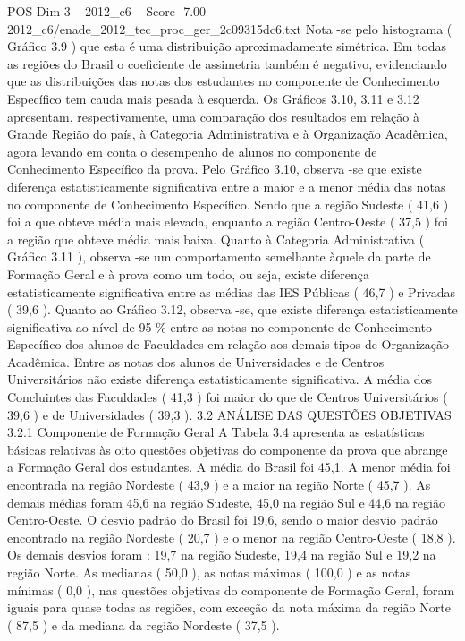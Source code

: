 \begin{textsample}{POS Dim 3 – 2012\_c6 – Score -7.00 – 2012\_c6/enade\_2012\_tec\_proc\_ger\_2c09315dc6.txt}
Nota -se pelo histograma ( Gráfico 3.9 ) que esta é uma distribuição aproximadamente simétrica.
Em todas as regiões do Brasil o coeficiente de assimetria também é negativo, evidenciando que as distribuições das notas dos estudantes no componente de Conhecimento Específico tem cauda mais pesada à esquerda.
Os Gráficos 3.10, 3.11 e 3.12 apresentam, respectivamente, uma comparação dos resultados em relação à Grande Região do país, à Categoria Administrativa e à Organização Acadêmica, agora levando em conta o desempenho de alunos no componente de Conhecimento Específico da prova.
Pelo Gráfico 3.10, observa -se que existe diferença estatisticamente significativa entre a maior e a menor média das notas no componente de Conhecimento Específico.
Sendo que a região Sudeste ( 41,6 ) foi a que obteve média mais elevada, enquanto a região Centro-Oeste ( 37,5 ) foi a região que obteve média mais baixa.
Quanto à Categoria Administrativa ( Gráfico 3.11 ), observa -se um comportamento semelhante àquele da parte de Formação Geral e à prova como um todo, ou seja, existe diferença estatisticamente significativa entre as médias das IES Públicas ( 46,7 ) e Privadas ( 39,6 ).
Quanto ao Gráfico 3.12, observa -se, que existe diferença estatisticamente significativa ao nível de 95 \% entre as notas no componente de Conhecimento Específico dos alunos de Faculdades em relação aos demais tipos de Organização Acadêmica.
Entre as notas dos alunos de Universidades e de Centros Universitários não existe diferença estatisticamente significativa.
A média dos Concluintes das Faculdades ( 41,3 ) foi maior do que de Centros Universitários ( 39,6 ) e de Universidades ( 39,3 ). 3.2 ANÁLISE DAS QUESTÕES OBJETIVAS 3.2.1 Componente de Formação Geral A Tabela 3.4 apresenta as estatísticas básicas relativas às oito questões objetivas do componente da prova que abrange a Formação Geral dos estudantes.
A média do Brasil foi 45,1.
A menor média foi encontrada na região Nordeste ( 43,9 ) e a maior na região Norte ( 45,7 ).
As demais médias foram 45,6 na região Sudeste, 45,0 na região Sul e 44,6 na região Centro-Oeste.
O desvio padrão do Brasil foi 19,6, sendo o maior desvio padrão encontrado na região Nordeste ( 20,7 ) e o menor na região Centro-Oeste ( 18,8 ).
Os demais desvios foram : 19,7 na região Sudeste, 19,4 na região Sul e 19,2 na região Norte.
As medianas ( 50,0 ), as notas máximas ( 100,0 ) e as notas mínimas ( 0,0 ), nas questões objetivas do componente de Formação Geral, foram iguais para quase todas as regiões, com exceção da nota máxima da região Norte ( 87,5 ) e da mediana da região Nordeste ( 37,5 ).

\end{textsample}
